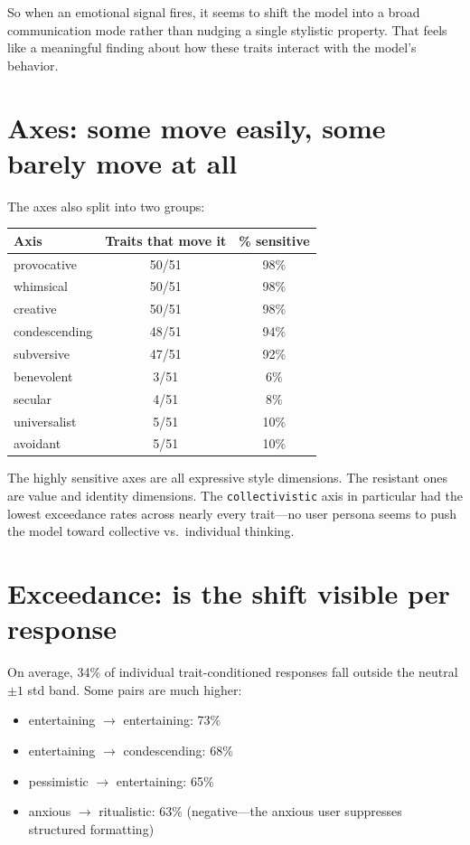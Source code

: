 \documentclass[11pt]{article}
\begin{document}
So when an emotional signal fires, it seems to shift the model into a broad communication mode rather than nudging a single stylistic property. That feels like a meaningful finding about how these traits interact with the model's behavior.

\section*{Axes: some move easily, some barely move at all}

The axes also split into two groups:

\begin{center}
\begin{tabular}{lcc}
\toprule
Axis & Traits that move it & \% sensitive \\
\midrule
provocative  & 50/51 & 98\% \\
whimsical    & 50/51 & 98\% \\
creative     & 50/51 & 98\% \\
condescending & 48/51 & 94\% \\
subversive   & 47/51 & 92\% \\
\midrule
benevolent   & 3/51  & 6\%  \\
secular      & 4/51  & 8\%  \\
universalist & 5/51  & 10\% \\
avoidant     & 5/51  & 10\% \\
\bottomrule
\end{tabular}
\end{center}

The highly sensitive axes are all expressive style dimensions. The resistant ones are value and identity dimensions. The \texttt{collectivistic} axis in particular had the lowest exceedance rates across nearly every trait---no user persona seems to push the model toward collective vs.\ individual thinking.

\section*{Exceedance: is the shift visible per response}

On average, 34\% of individual trait-conditioned responses fall outside the neutral $\pm 1$ std band. Some pairs are much higher:

\begin{itemize}[leftmargin=1.5em]
    \item entertaining $\rightarrow$ entertaining: 73\%
    \item entertaining $\rightarrow$ condescending: 68\%
    \item pessimistic $\rightarrow$ entertaining: 65\%
    \item anxious $\rightarrow$ ritualistic: 63\% (negative---the anxious user suppresses structured formatting)
\end{itemize}
\end{document}

